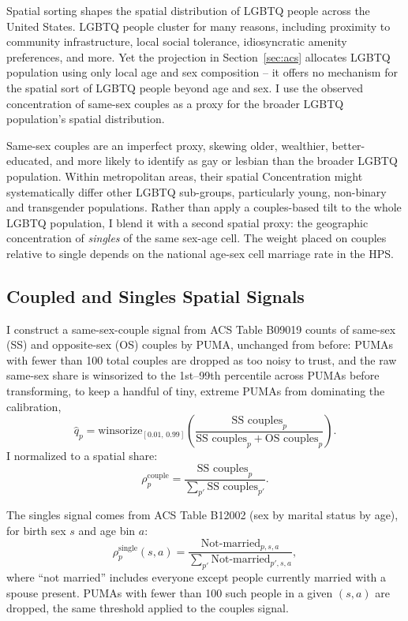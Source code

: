 \documentclass[11pt]{article}
\begin{document}
Spatial sorting shapes the spatial distribution of LGBTQ people across the
United States. LGBTQ people cluster for many reasons, including proximity
to community infrastructure, local social tolerance, idiosyncratic amenity
preferences, and more. Yet the projection in Section~\ref{sec:acs}
allocates LGBTQ population using only local age and sex composition -- it
offers no mechanism for the spatial sort of LGBTQ people beyond age and
sex. I use the observed concentration of same-sex couples as a proxy for
the broader LGBTQ population's spatial distribution.

Same-sex couples are an imperfect proxy, skewing older,
wealthier, better-educated, and more likely to identify as gay or lesbian
than the broader LGBTQ population. Within metropolitan areas, their spatial 
Concentration might systematically differ other LGBTQ sub-groups, particularly young, non-binary and transgender populations. Rather than
apply a couples-based tilt to the whole LGBTQ population, I blend it with a second spatial proxy: the geographic concentration of
\emph{singles} of the same sex-age cell. The weight placed on couples relative to single depends on the national age-sex cell marriage rate in the HPS.

\subsection{Coupled and Singles Spatial Signals}

I construct a same-sex-couple signal from ACS Table B09019 counts of
same-sex (SS) and opposite-sex (OS) couples by PUMA, unchanged from before:
PUMAs with fewer than 100 total couples are dropped as too noisy to trust,
and the raw same-sex share is winsorized to the 1st--99th percentile across
PUMAs before transforming, to keep a handful of tiny, extreme PUMAs from
dominating the calibration,
\[
\hat q_p = \text{winsorize}_{[0.01,\,0.99]}
\!\left(\frac{\text{SS couples}_p}{\text{SS couples}_p + \text{OS
couples}_p}\right).
\]
I normalized to a spatial share:
\[
\rho_p^{\text{couple}} = \frac{\text{SS couples}_p}{\sum_{p'} \text{SS
couples}_{p'}}.
\]

The singles signal comes from ACS Table B12002 (sex by marital status
by age), for birth sex $s$ and age bin $a$:
\[
\rho_p^{\text{single}}(s,a) = \frac{\text{Not-married}_{p,s,a}}
{\sum_{p'} \text{Not-married}_{p',s,a}},
\]
where ``not married'' includes everyone except people currently married with a
spouse present. PUMAs with fewer than 100 such people in a
given $(s,a)$ are dropped, the same threshold applied to the couples signal.
\end{document}
